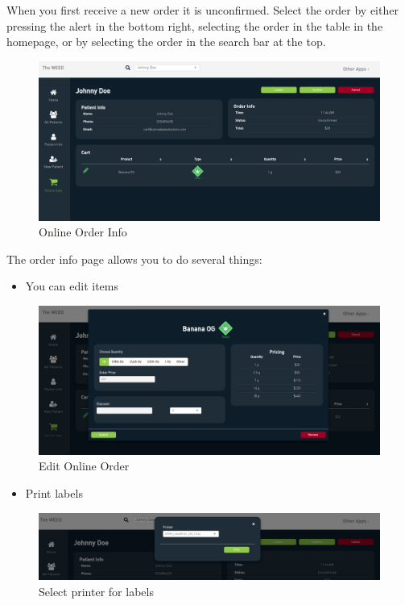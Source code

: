 \documentclass[]{book}
\providecommand{\tightlist}{%
  \setlength{\itemsep}{0pt}\setlength{\parskip}{0pt}}
\theoremstyle{definition}
\theoremstyle{definition}
\theoremstyle{definition}
\theoremstyle{remark}
\begin{document}
When you first receive a new order it is unconfirmed. Select the order
by either pressing the alert in the bottom right, selecting the order in
the table in the homepage, or by selecting the order in the search bar
at the top.

\begin{figure}
\centering
\includegraphics{images/online2.png}
\caption{Online Order Info}
\end{figure}

The order info page allows you to do several things:

\begin{itemize}
\tightlist
\item
  You can edit items
\end{itemize}

\begin{figure}
\centering
\includegraphics{images/online3.png}
\caption{Edit Online Order}
\end{figure}

\begin{itemize}
\tightlist
\item
  Print labels
\end{itemize}

\begin{figure}
\centering
\includegraphics{images/online4.png}
\caption{Select printer for labels}
\end{figure}
\end{document}
